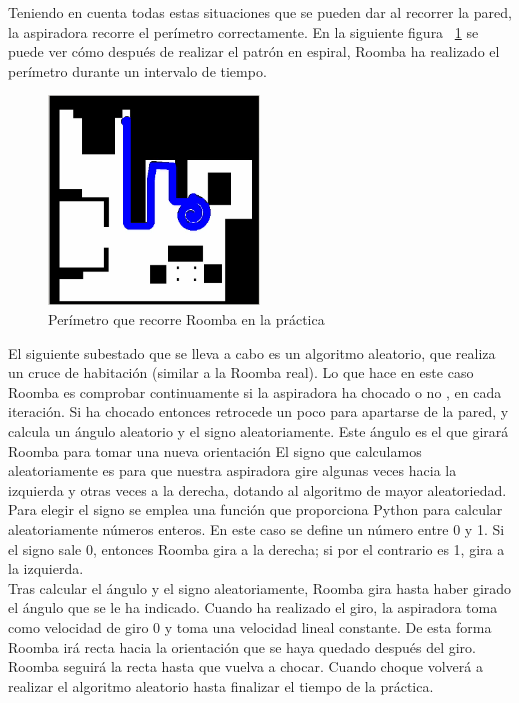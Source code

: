 Teniendo en cuenta todas estas situaciones que se pueden dar al recorrer la pared, la aspiradora recorre el perímetro correctamente. En la siguiente figura ~\ref{fig.Perimetro_Roomba} se puede ver cómo después de realizar el patrón en espiral, Roomba ha realizado el perímetro durante un intervalo de tiempo.\\

\begin{figure}[H]
  \begin{center}
    \includegraphics[width=0.5\textwidth]{figures/Vacuum/Perimetro_Roomba.png}
		\caption{Perímetro que recorre Roomba en la práctica}
		\label{fig.Perimetro_Roomba}
		\end{center}
\end{figure}

El siguiente subestado que se lleva a cabo es un algoritmo aleatorio, que realiza un cruce de habitación (similar a la Roomba real). Lo que hace en este caso Roomba es comprobar continuamente si la aspiradora ha chocado o no , en cada iteración. Si ha chocado entonces retrocede un poco para apartarse de la pared, y calcula un ángulo aleatorio y el signo aleatoriamente. Este ángulo es el que girará Roomba para tomar una nueva orientación El signo que calculamos aleatoriamente es para que nuestra aspiradora gire algunas veces hacia la izquierda y otras veces a la derecha, dotando al algoritmo de mayor aleatoriedad. Para elegir el signo se emplea una función que proporciona Python para calcular aleatoriamente números enteros. En este caso se define un número entre 0 y 1. Si el signo sale 0, entonces Roomba gira a la derecha; si por el contrario es 1, gira a la izquierda.\\

Tras calcular el ángulo y el signo aleatoriamente, Roomba gira hasta haber girado el ángulo que se le ha indicado. Cuando ha realizado el giro, la aspiradora toma como velocidad de giro 0 y toma una velocidad lineal constante. De esta forma Roomba irá recta hacia la orientación que se haya quedado después del giro. Roomba seguirá la recta hasta que vuelva a chocar. Cuando choque volverá a realizar el algoritmo aleatorio hasta finalizar el tiempo de la práctica.\\



